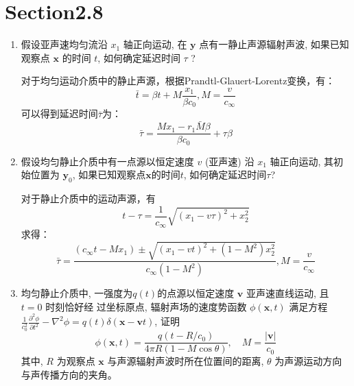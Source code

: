 \section*{Section2.8}

\begin{enumerate}
    \item 假设亚声速均匀流沿 \( x_{1} \) 轴正向运动, 
    在 \( \boldsymbol{y} \) 点有一静止声源辐射声波, 
    如果已知观察点 \( \boldsymbol{x} \) 的时间 \(t\),
    如何确定延迟时间 \( \tau \) ?
    
        对于均匀运动介质中的静止声源，根据Prandtl-Glauert-Lorentz变换，有：
        \begin{equation}
            \bar{t}=\beta t+M \frac{x_{1}}{\beta c_{0}}, M=\frac{v}{c_{\infty}}
        \end{equation}
        可以得到延迟时间\(\bar{\tau}\)为：
        \begin{equation}
            \bar{\tau}=\frac{M x_{1}-r_{1} \bar{M} \beta}{\beta c_{0}}+\tau \beta
        \end{equation}
        
    
    \item  假设均匀静止介质中有一点源以恒定速度 \(v\) (亚声速) 沿 \( x_{1} \) 轴正向运动,
    其初始位置为 \( \boldsymbol{y}_{0} \), 
    如果已知观察点\( \boldsymbol{x} \)的时间\(t\), 如何确定延迟时间\( \tau \)?
    
        对于静止介质中的运动声源，有
        \begin{equation}
            t-\tau=\frac{1}{c_{\infty}} \sqrt{\left(x_{1}-v \tau\right)^{2}+x_{2}^{2}}
        \end{equation}
        求得：
        \begin{equation}
            \bar{\tau}=\frac{\left(c_{\infty} t-M x_{1}\right) \pm \sqrt{\left(x_{1}-v t\right)^{2}+\left(1-M^{2}\right)x_{2}^{2}}}{c_{\infty}\left(1-M^{2}\right)}, M=\frac{v}{c_{\infty}}
        \end{equation}
    
    \item 均匀静止介质中, 一强度为\( q(t) \)的点源以恒定速度 \( \boldsymbol{v} \) 亚声速直线运动, 
    且 \( t=0 \) 时刻恰好经 过坐标原点, 辐射声场的速度势函数 \( \phi(\boldsymbol{x}, t) \) 满足方程
    \( \frac{1}{c_{0}^{2}} \frac{\partial^{2} \phi}{\partial t^{2}}-\nabla^{2} \phi=q(t) \delta(\boldsymbol{x}-\boldsymbol{v} t) \), 
    证明
    \[
    \phi(\boldsymbol{x}, t)=\frac{q\left(t-R / c_{0}\right)}{4 \pi R(1-M \cos \theta)}, \quad M=\frac{|\boldsymbol{v}|}{c_{0}}
    \]
    其中, \( R \) 为观察点 \( \boldsymbol{x} \) 与声源辐射声波时所在位置间的距离, \(\theta \) 为声源运动方向与声传播方向的夹角。

\end{enumerate}

\clearpage